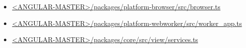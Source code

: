 




\begin{itemize}
  \item \href{https://github.com/angular/angular/blob/master/packages/platform-browser/src/browser.ts}
        {<ANGULAR-MASTER>/packages/platform-browser/src/browser.ts}
\end{itemize}





\begin{itemize}
  \item \href{https://github.com/angular/angular/blob/master/packages/platform-webworker/src/worker_app.ts}
        {<ANGULAR-MASTER>/packages/platform-webworker/src/worker\_app.ts}
\end{itemize}





\begin{itemize}
  \item \href{https://github.com/angular/angular/blob/master/packages/core/src/view/services.ts}
        {<ANGULAR-MASTER>/packages/core/src/view/services.ts}
\end{itemize}




